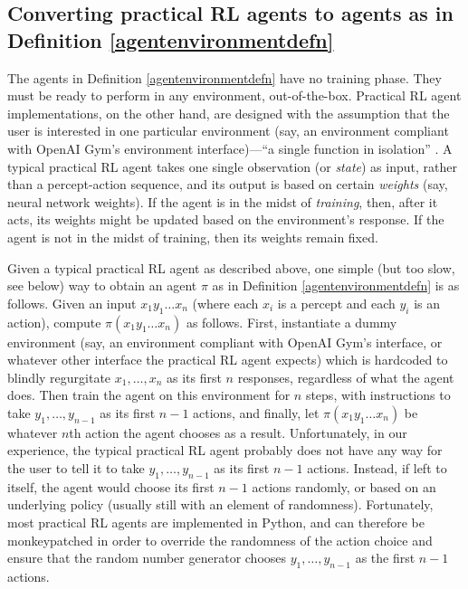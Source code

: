 \documentclass{article}
\begin{document}
\subsection{Converting practical RL agents to agents as in
Definition \ref{agentenvironmentdefn}}
\label{mappingtouniversalsection}

The agents in Definition \ref{agentenvironmentdefn} have no training phase. They must be
ready to perform in any environment, out-of-the-box. Practical RL agent implementations,
on the other hand, are designed with the assumption that the user is interested in one
particular environment (say, an environment compliant with OpenAI Gym's
environment interface)---``a single function in isolation'' \cite{thrun1998lifelong}.
A typical practical RL agent takes one single observation (or
\emph{state}) as input, rather than a percept-action sequence, and its output is based
on certain \emph{weights} (say, neural network weights). If the agent is in the midst of
\emph{training}, then, after it acts, its weights might be updated based on the environment's
response. If the agent is not in the midst of training, then its weights remain fixed.

Given a typical practical RL agent as described above, one simple
(but too slow, see below)
way to obtain an agent
$\pi$ as in Definition \ref{agentenvironmentdefn} is as follows.
Given an input $x_1y_1\ldots x_n$ (where each $x_i$ is a percept and each $y_i$ is an
action), compute $\pi(x_1y_1\ldots x_n)$ as follows. First, instantiate a dummy
environment (say, an environment compliant with OpenAI Gym's interface, or whatever other
interface the practical RL agent expects) which is hardcoded to blindly regurgitate
$x_1,\ldots,x_n$ as its first $n$ responses, regardless of what the agent does.
Then train the agent on this environment for $n$ steps, with instructions to
take $y_1,\ldots,y_{n-1}$ as its first $n-1$ actions, and finally, let
$\pi(x_1y_1\ldots x_n)$ be whatever $n$th action the agent chooses as a result.
Unfortunately, in our experience, the typical practical RL agent probably does not have
any way for the user to tell it to take $y_1,\ldots,y_{n-1}$ as its first $n-1$
actions. Instead, if left to itself, the agent would choose its first $n-1$ actions
randomly, or based on an underlying policy (usually still with an element of randomness).
Fortunately, most practical RL agents are implemented in Python, and can therefore
be monkeypatched in order to override the randomness of the action choice and ensure
that the random number generator chooses $y_1,\ldots,y_{n-1}$ as the first $n-1$
actions.
\end{document}

